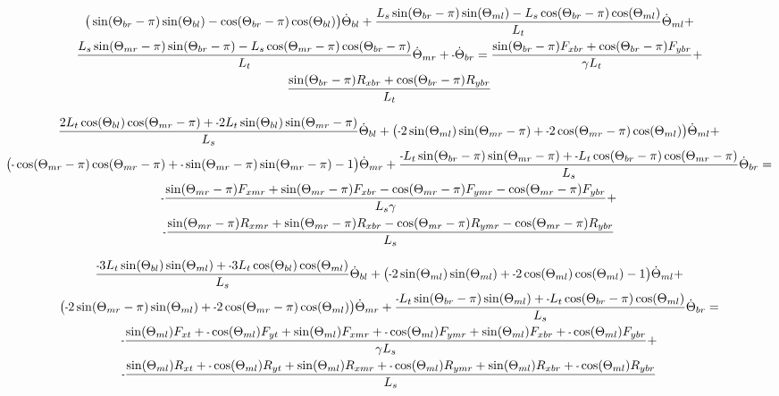 \documentclass[11pt, landscape]{article}
\newcommand{\mn}{\scalebox{0.7}[1.0]{-}}
\begin{document}
\begin{multline}
\big(\sin(\Theta_{br}-\pi)\sin(\Theta_{bl}) - \cos(\Theta_{br}-\pi)\cos(\Theta_{bl})\big)\dot{\Theta}_{bl} + 
\frac{L_{s}\sin(\Theta_{br}-\pi)\sin(\Theta_{ml}) - L_{s}\cos(\Theta_{br}-\pi)\cos(\Theta_{ml})}{L_{t}}\dot{\Theta}_{ml}  + \\
\frac{L_{s}\sin(\Theta_{mr}-\pi)\sin(\Theta_{br}-\pi) - L_{s}\cos(\Theta_{mr}-\pi)\cos(\Theta_{br}-\pi)}{L_{t}}\dot{\Theta}_{mr} +
\mn\dot{\Theta}_{br} =
\frac{\sin(\Theta_{br}-\pi)F_{xbr} + \cos(\Theta_{br}-\pi)F_{ybr}}{\gamma L_{t}} + \\
\frac{\sin(\Theta_{br}-\pi)R_{xbr} + \cos(\Theta_{br}-\pi)R_{ybr}}{L_{t}}
\end{multline}


\begin{multline}
\frac{2L_{t}\cos(\Theta_{bl})\cos(\Theta_{mr}-\pi) + \mn 2L_{t}\sin(\Theta_{bl})\sin(\Theta_{mr}-\pi)}{L_{s}}\dot{\Theta}_{bl} + 
\big(\mn 2\sin(\Theta_{ml})\sin(\Theta_{mr}-\pi) + \mn 2\cos(\Theta_{mr}-\pi)\cos(\Theta_{ml}) \big)\dot{\Theta}_{ml} + \\
\big( \mn \cos(\Theta_{mr}-\pi)\cos(\Theta_{mr}-\pi) + \mn\sin(\Theta_{mr}-\pi)\sin(\Theta_{mr}-\pi) - 1\big)\dot{\Theta}_{mr} + 
\frac{\mn L_{t}\sin(\Theta_{br}-\pi)\sin(\Theta_{mr}-\pi) + \mn L_{t}\cos(\Theta_{br}-\pi)\cos(\Theta_{mr}-\pi)}{L_{s}}\dot{\Theta}_{br} = \\
\mn\frac{\sin(\Theta_{mr}-\pi)F_{xmr} + \sin(\Theta_{mr}-\pi)F_{xbr} - \cos(\Theta_{mr}-\pi)F_{ymr} - \cos(\Theta_{mr}-\pi)F_{ybr}}{L_{s}\gamma} + \\
\mn\frac{\sin(\Theta_{mr}-\pi)R_{xmr} + \sin(\Theta_{mr}-\pi)R_{xbr} - \cos(\Theta_{mr}-\pi)R_{ymr} - \cos(\Theta_{mr}-\pi)R_{ybr}}{L_{s}}
\end{multline}



\begin{multline}
\frac{\mn 3L_{t}\sin(\Theta_{bl})\sin(\Theta_{ml}) + \mn3L_{t}\cos(\Theta_{bl})\cos(\Theta_{ml})}{L_s}\dot{\Theta}_{bl} + 
\big(\mn 2\sin(\Theta_{ml})\sin(\Theta_{ml}) + \mn 2\cos(\Theta_{ml})\cos(\Theta_{ml}) - 1\big)\dot{\Theta}_{ml} + \\
\big(\mn 2\sin(\Theta_{mr}-\pi)\sin(\Theta_{ml}) + \mn 2\cos(\Theta_{mr}-\pi)\cos(\Theta_{ml}) \big)\dot{\Theta}_{mr} + 
\frac{\mn L_{t}\sin(\Theta_{br}-\pi)\sin(\Theta_{ml}) + \mn L_{t}\cos(\Theta_{br}-\pi)\cos(\Theta_{ml})}{L_s}\dot{\Theta}_{br} = \\
\mn \frac{\sin(\Theta_{ml})F_{xt } + \mn \cos(\Theta_{ml})F_{yt } + \sin(\Theta_{ml})F_{xmr} + \mn \cos(\Theta_{ml})F_{ymr} + \sin(\Theta_{ml})F_{xbr} + \mn \cos(\Theta_{ml})F_{ybr}}{\gamma L_s} + \\
\mn \frac{\sin(\Theta_{ml})R_{xt } + \mn \cos(\Theta_{ml})R_{yt } + \sin(\Theta_{ml})R_{xmr} + \mn \cos(\Theta_{ml})R_{ymr} + \sin(\Theta_{ml})R_{xbr} + \mn \cos(\Theta_{ml})R_{ybr}}{L_s}
\end{multline}
\end{document}
